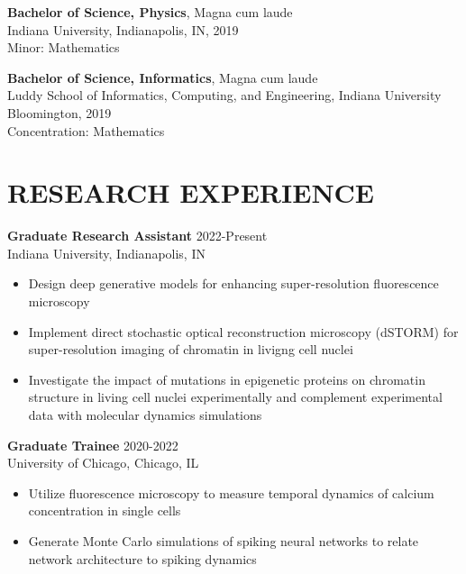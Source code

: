 \documentclass[margin, 10pt]{res} %
\begin{document}
\begin{resume}
\textbf{Bachelor of Science, Physics}, Magna cum laude\\
Indiana University, Indianapolis, IN, 2019\\
Minor: Mathematics 

\textbf{Bachelor of Science, Informatics}, Magna cum laude\\
Luddy School of Informatics, Computing, and Engineering, Indiana University Bloomington, 2019\\
Concentration: Mathematics 
  
 
\section{RESEARCH EXPERIENCE}

\textbf{Graduate Research Assistant} \hfill 2022-Present \\
Indiana University, Indianapolis, IN

\begin{itemize} \itemsep -2pt %

\item Design deep generative models for enhancing super-resolution fluorescence microscopy

\item Implement direct stochastic optical reconstruction microscopy (dSTORM) for super-resolution imaging of chromatin in livigng cell nuclei

\item Investigate the impact of mutations in epigenetic proteins on chromatin structure in living cell nuclei experimentally and complement experimental data with molecular dynamics simulations
 
\end{itemize}

\textbf{Graduate Trainee} \hfill 2020-2022 \\
University of Chicago, Chicago, IL

\begin{itemize} \itemsep -2pt %

\item Utilize fluorescence microscopy to measure temporal dynamics of calcium concentration in single cells
\item Generate Monte Carlo simulations of spiking neural networks to relate network architecture to spiking dynamics
 

\end{itemize}
\end{resume}
\end{document}
